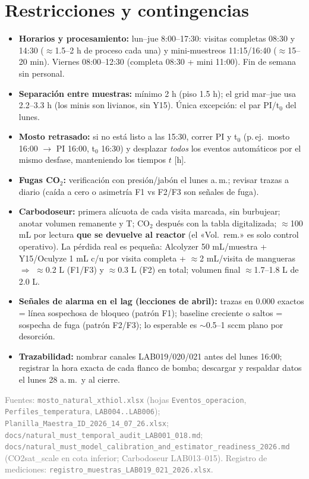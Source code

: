 \documentclass[10pt,landscape]{article}
\begin{document}
\section{Restricciones y contingencias}
\begin{itemize}\setlength{\itemsep}{1pt}
\item \textbf{Horarios y procesamiento:} lun--jue 8:00--17:30: visitas completas 08:30 y 14:30 ($\approx$1.5--2 h de proceso cada una) y mini-muestreos 11:15/16:40 ($\approx$15--20 min). Viernes 08:00--12:30 (completa 08:30 + mini 11:00). Fin de semana sin personal.
\item \textbf{Separación entre muestras:} mínimo 2 h (piso 1.5 h); el grid mar--jue usa 2.2--3.3 h (los minis son livianos, sin Y15). Única excepción: el par PI/t$_0$ del lunes.
\item \textbf{Mosto retrasado:} si no está listo a las 15:30, correr PI y t$_0$ (p.\,ej.\ mosto 16:00 $\rightarrow$ PI 16:00, t$_0$ 16:30) y desplazar \emph{todos} los eventos automáticos por el mismo desfase, manteniendo los tiempos $t$ [h].
\item \textbf{Fugas CO$_2$:} verificación con presión/jabón el lunes a.\,m.; revisar trazas a diario (caída a cero o asimetría F1 vs F2/F3 son señales de fuga).
\item \textbf{Carbodoseur:} primera alícuota de cada visita marcada, sin burbujear; anotar volumen remanente y T; CO$_2$ después con la tabla digitalizada; $\approx$100 mL por lectura \textbf{que se devuelve al reactor} (el «Vol.\ rem.» es solo control operativo). La pérdida real es pequeña: Alcolyzer 50 mL/muestra + Y15/Oculyze 1 mL c/u por visita completa + $\approx$2 mL/visita de mangueras $\Rightarrow$ $\approx$0.2 L (F1/F3) y $\approx$0.3 L (F2) en total; volumen final $\approx$1.7--1.8 L de 2.0 L.
\item \textbf{Señales de alarma en el lag (lecciones de abril):} trazas en 0.000 exactos = línea sospechosa de bloqueo (patrón F1); baseline creciente o saltos = sospecha de fuga (patrón F2/F3); lo esperable es $\sim$0.5--1 sccm plano por desorción.
\item \textbf{Trazabilidad:} nombrar canales LAB019/020/021 antes del lunes 16:00; registrar la hora exacta de cada flanco de bomba; descargar y respaldar datos el lunes 28 a.\,m.\ y al cierre.
\end{itemize}

\vspace{4pt}
{\sloppy
\noindent\begin{minipage}{\linewidth}
\textcolor{gray}{\footnotesize Fuentes: \texttt{mosto\_natural\_xthiol.xlsx} (hojas \texttt{Eventos\_operacion}, \texttt{Perfiles\_temperatura}, \texttt{LAB004..LAB006}); \texttt{Planilla\_Maestra\_ID\_2026\_14\_07\_26.xlsx}; \texttt{docs/natural\_must\_temporal\_audit\_LAB001\_018.md}; \texttt{docs/natural\_must\_model\_calibration\_and\_estimator\_readiness\_2026.md} (CO2sat\_scale en cota inferior; Carbodoseur LAB013--015). Registro de mediciones: \texttt{registro\_muestras\_LAB019\_021\_2026.xlsx}.}
\end{minipage}\par}
\end{document}
